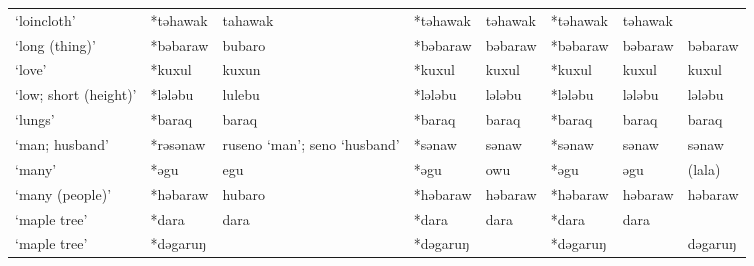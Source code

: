 \begin{landscape}
\begin{longtable}[c]{@{}p{3cm}<{\raggedright}p{2.75cm}<{\raggedright}p{2.75cm}<{\raggedright}p{2.75cm}<{\raggedright}p{2.75cm}<{\raggedright}p{2.75cm}<{\raggedright}p{2.75cm}<{\raggedright}p{2.75cm}<{\raggedright}@{}}
`loincloth'                                          & *təhawak           & tahawak                        & *təhawak           & təhawak                    & *təhawak         & təhawak                  &                                   \\
`long (thing)'                                       & *bəbaraw           & bubaro                         & *bəbaraw           & bəbaraw                    & *bəbaraw         & bəbaraw                  & bəbaraw                           \\
`love'                                               & *kuxul             & kuxun                          & *kuxul             & kuxul                      & *kuxul           & kuxul                    & kuxul                             \\
`low; short (height)'                                & *lələbu            & lulebu                         & *lələbu            & lələbu                     & *lələbu          & lələbu                   & lələbu                            \\
`lungs'                                              & *baraq             & baraq                          & *baraq             & baraq                      & *baraq           & baraq                    & baraq                             \\
`man; husband'                                       & *rəsənaw           & ruseno `man'; seno `husband'   & *sənaw             & sənaw                      & *sənaw           & sənaw                    & sənaw                             \\
`many'                                               & *əgu               & egu                            & *əgu               & owu                        & *əgu             & əgu                      & (lala)                            \\
`many (people)'                                      & *həbaraw           & hubaro                         & *həbaraw           & həbaraw                    & *həbaraw         & həbaraw                  & həbaraw                           \\
`maple tree'                                         & *dara              & dara                           & *dara              & dara                       & *dara            & dara                     &                                   \\
`maple tree'                                         & *dəgaruŋ           &                                & *dəgaruŋ           &                            & *dəgaruŋ         &                          & dəgaruŋ                           \\

\end{longtable}
\end{landscape}
